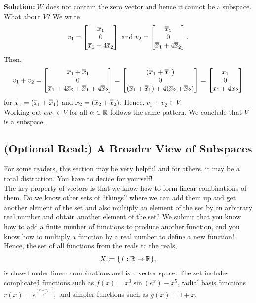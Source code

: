 \textbf{Solution:} $W$ does not contain the zero vector and hence it cannot be a subspace. What about $V$? We write
$$v_1 = \begin{bmatrix} \overline{x}_1 \\ 0 \\ \overline{x}_1 + 4 \overline{x}_2\end{bmatrix}~\text{and}~v_2 = \begin{bmatrix} \doverline{x}_1 \\ 0 \\ \doverline{x}_1 + 4 \doverline{x}_2\end{bmatrix}. $$
Then, 
$$ v_1 + v_2 = \begin{bmatrix} \overline{x}_1 +  \doverline{x}_1 \\ 0 \\ \overline{x}_1 + 4 \overline{x}_2 +  \doverline{x}_1 + 4 \doverline{x}_2\end{bmatrix} = \begin{bmatrix} (\overline{x}_1 +  \doverline{x}_1) \\ 0 \\ (\overline{x}_1 + \doverline{x}_1) + 4  (\overline{x}_2 + \doverline{x}_2)\end{bmatrix}= \begin{bmatrix} x_1 \\ 0 \\  x_1+ 4 x_2\end{bmatrix}$$
for $x_1 = (\overline{x}_1 + \doverline{x}_1)$ and $x_2 = (\overline{x}_2 + \doverline{x}_2)$. Hence, $v_1 + v_2 \in V.$ \\

Working out $\alpha v_1 \in V$ for all $\alpha \in \mathbb R$ follows the same pattern. We conclude that $V$ is a subspace. \Qed
\vspace*{.5cm}

\subsection{(Optional Read:) A Broader View of Subspaces}
\label{sec:FunctionSpaces}

For some readers, this section may be very helpful and for others, it may be a total distraction. You have to decide for yourself!\\

The key property of vectors is that we know how to form linear combinations of them. Do we know other sets of ``things'' where we can add them up and get another element of the set and also multiply an element of the set by an arbitrary real number and obtain another element of the set? We submit that you know how to add a finite number of functions to produce another function, and you know how to multiply a function by a real number to define a new function! Hence, the set of all functions from the reals to the reals,
$$ X := \{ f:\mathbb R  \to \mathbb R \},$$
is closed under linear combinations and is a vector space. The set includes complicated functions such as $f(x) = x^3 \sin(e^x) - x^5$, radial basis functions $r(x)=e^{\frac{(x - x_c)^2}{s^2}},$ and simpler functions such as $g(x) = 1 + x$. \\

